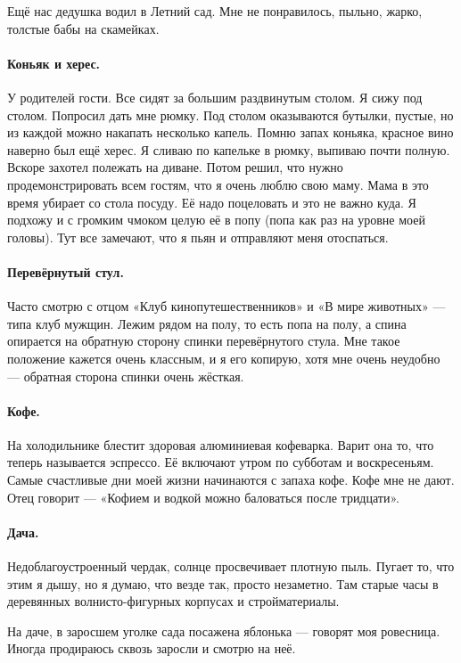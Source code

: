 \documentclass{book}
\begin{document}
Ещё нас дедушка водил в Летний сад.
Мне не понравилось, пыльно, жарко, толстые бабы на скамейках.

\paragraph{Коньяк и херес.}
У родителей гости.
Все сидят за большим раздвинутым столом.
Я сижу под столом.
Попросил дать мне рюмку.
Под столом оказываются бутылки, пустые, но из каждой можно накапать несколько капель.
Помню запах коньяка, красное вино наверно был ещё херес.
Я сливаю по капельке в рюмку, выпиваю почти полную.
Вскоре захотел полежать на диване.
Потом решил, что нужно продемонстрировать всем гостям,
что я очень люблю свою маму. 
Мама в это время убирает со стола посуду.
Её надо поцеловать и это не важно куда.
Я подхожу и с громким чмоком целую её в попу (попа как раз на уровне моей головы).
Тут все замечают, что я пьян и отправляют меня отоспаться.

\paragraph{Перевёрнутый стул.}
Часто смотрю с отцом «Клуб кинопутешественников» и «В мире животных» --- типа клуб мужщин.
Лежим рядом на полу, то есть попа на полу, а спина опирается на обратную сторону спинки перевёрнутого стула.
Мне такое положение кажется очень классным, и я его копирую,
хотя мне очень неудобно --- обратная сторона спинки очень жёсткая.

\paragraph{Кофе.}
На холодильнике блестит здоровая алюминиевая кофеварка.
Варит она то, что теперь называется эспрессо.
Её включают утром по субботам и воскресеньям. 
Самые счастливые дни моей жизни начинаются с запаха кофе.
Кофе мне не дают.
Отец говорит --- «Кофием и водкой можно баловаться после тридцати».

\paragraph{Дача.}
Недоблагоустроенный чердак, солнце просвечивает плотную пыль.
Пугает то, что этим я дышу, но я думаю, что везде так, просто незаметно.
Там старые часы в деревянных волнисто-фигурных корпусах и стройматериалы.

На даче, в заросшем уголке сада посажена яблонька --- говорят моя ровесница.
Иногда продираюсь сквозь заросли и смотрю на неё.
\end{document}
